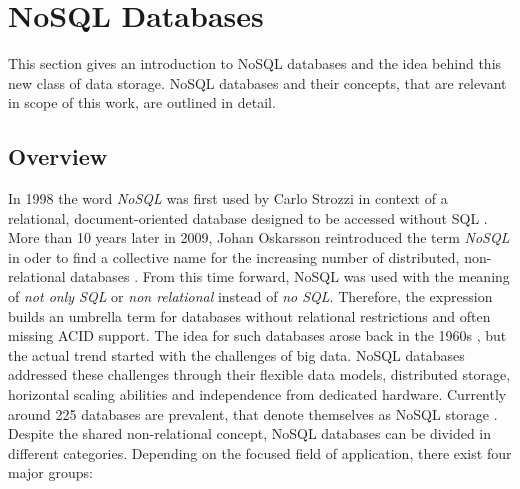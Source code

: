 \section{NoSQL Databases}
This section gives an introduction to NoSQL databases and the idea behind this new class of data storage. NoSQL databases and their concepts, that are relevant in scope of this work, are outlined in detail.

\subsection{Overview}
In 1998 the word \textit{NoSQL} was first used by Carlo Strozzi in context of a relational, document-oriented database designed to be accessed without SQL \cite{Strozzi:2007}. More than 10 years later in 2009, Johan Oskarsson reintroduced the term \textit{NoSQL} in oder to find a collective name for the increasing number of distributed, non-relational databases \cite{Oskarsson:2009}. From this time forward, NoSQL was used with the meaning of \textit{not only SQL} or \textit{non relational} instead of \textit{no SQL}. Therefore, the expression builds an umbrella term for databases without relational restrictions and often missing ACID support. The idea for such databases arose back in the 1960s \cite{IBM:2016, Nelson:1965}, but the actual trend started with the challenges of big data. NoSQL databases addressed these challenges through their flexible data models, distributed storage, horizontal scaling abilities and independence from dedicated hardware. Currently around 225 databases are prevalent, that denote themselves as NoSQL storage \cite{Edlich:2016}. Despite the shared non-relational concept, NoSQL databases can be divided in different categories. Depending on the focused field of application, there exist four major groups:

